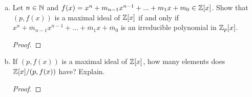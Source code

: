 \begin{itemize}
\begin{enumerate}[(a)]
\begin{proof}
    \end{proof}
    
    \item Let $n \in \mathbb{N}$ and $f(x) = x^n + m_{n-1} x^{n-1} + ... + m_1 x + m_0 \in \mathbb{Z}[x]$. Show that $(p, f(x))$ is a maximal ideal of $\mathbb{Z}[x]$ if and only if $x^n + \overline{m}_{n-1} x^{n-1} + ... + \overline{m}_1 x + \overline{m}_0$ is an irreducible polynomial in $\mathbb{Z}_p[x]$.
    \begin{proof}

    \end{proof}
    
    \item If $(p, f(x))$ is a maximal ideal of $\mathbb{Z}[x]$, how many elements does $\mathbb{Z}[x]/(p, f(x))$ have? Explain.
    \begin{proof}

    \end{proof}
\end{enumerate}













\end{itemize}
